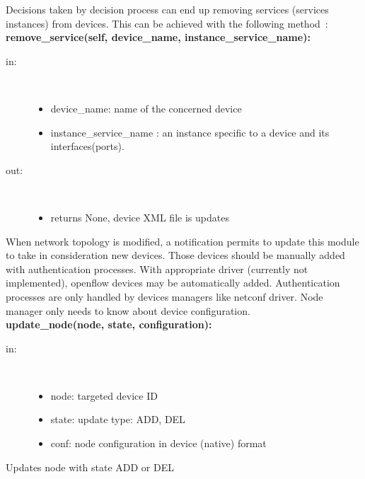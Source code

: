 Decisions taken by decision process can end up removing services (services instances) from devices. This can be achieved with the following method~:\\[1\baselineskip]

\textbf{remove\_service(self, device\_name, instance\_service\_name):}
\begin{description}
    \item[in:] \hfill \\
        \begin{itemize}
            \item device\_name: name of the concerned device
            \item instance\_service\_name : an instance specific to a device and its interfaces(ports).
        \end{itemize}
    \item[out:] \hfill \\
        \begin{itemize}
            \item returns None, device XML file is updates
        \end{itemize}
\end{description}
When network topology is modified, a notification permits to update this module to take in consideration new devices. Those devices should be manually added with authentication processes. With appropriate driver (currently not implemented), openflow devices may be automatically added. Authentication processes are only handled by devices managers like netconf driver. Node manager only needs to know about device configuration.\\[1\baselineskip]

\textbf{update\_node(node, state, configuration):}
\begin{description}
    \item[in:] \hfill \\
        \begin{itemize}
            \item node: targeted device ID
            \item state: update type: ADD, DEL
            \item conf: node configuration in device (native) format
        \end{itemize}
\end{description}
Updates node with state ADD or DEL\\


